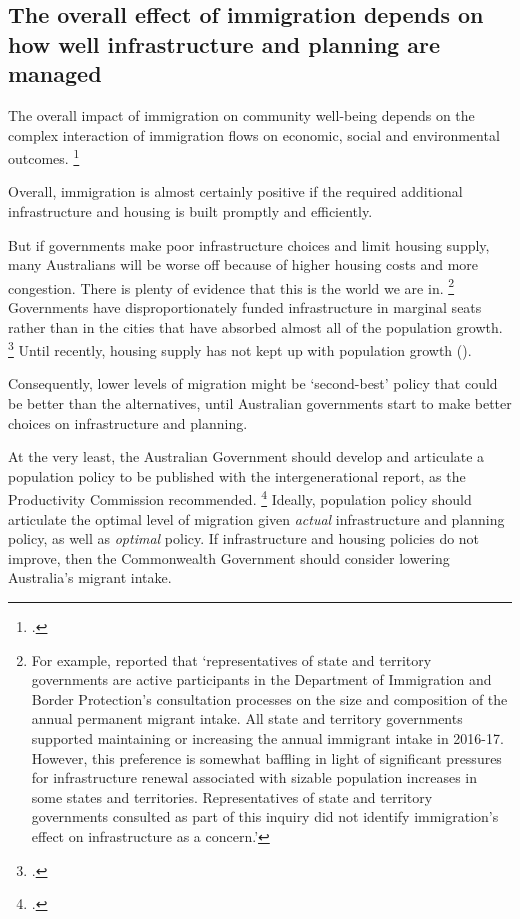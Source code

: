 \subsection{The overall effect of immigration depends on how well infrastructure and planning are managed}\label{subsec:the-overall-effect-of-immigration-depends-on-how-well-infrastructure-and-planning-are-managed}

The overall impact of immigration on community well-being depends on the complex interaction of immigration flows on economic, social and environmental outcomes.%
	\footcites[][83]{CommissionMigrantIntake2016}{Rizvi_2018_immigration_debate_inside_story}

Overall, immigration is almost certainly positive if the required additional infrastructure and housing is built promptly and efficiently.

But if governments make poor infrastructure choices and limit housing supply, many Australians will be worse off because of higher housing costs and more congestion.
There is plenty of evidence that this is the world we are in.%
    \footnote{For example, \textcite[105][]{CommissionMigrantIntake2016} reported that `representatives of state and territory governments are active participants in the Department of Immigration and Border Protection's consultation processes on the size and composition of the annual permanent migrant intake. All state and territory governments supported maintaining or increasing the annual immigrant intake in 2016-17. However, this preference is somewhat baffling in light of significant pressures for infrastructure renewal associated with sizable population increases in some states and territories. Representatives of state and territory governments consulted as part of this inquiry did not identify immigration’s effect on infrastructure as a concern.'}
Governments have disproportionately funded infrastructure in marginal seats rather than in the cities that have absorbed almost all of the population growth.%
	\footcite{Terrill2016Roadsrichesbetter}
Until recently, housing supply has not kept up with population growth ().

Consequently, lower levels of migration might be `second-best' policy that could be better than the alternatives, until Australian governments start to make better choices on infrastructure and planning.

At the very least, the Australian Government should develop and articulate a population policy to be published with the intergenerational report, as the Productivity Commission recommended.%
	\footcite[][37]{CommissionMigrantIntake2016}
Ideally, population policy should articulate the optimal level of migration given \emph{actual} infrastructure and planning policy, as well as \emph{optimal} policy.
If infrastructure and housing policies do not improve, then the Commonwealth Government should consider lowering Australia's migrant intake.

